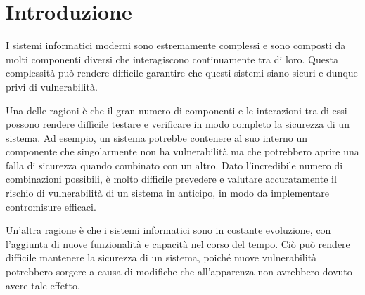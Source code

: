 \documentclass[12pt,italian]{report}
\begin{document}

% 


\chapter{Introduzione}
\label{sec:introduzione}
I sistemi informatici moderni sono estremamente complessi e sono composti da
molti componenti diversi che interagiscono continuamente tra di loro.
Questa complessità può rendere difficile garantire che questi sistemi siano
sicuri e dunque privi di vulnerabilità.

Una delle ragioni è che il gran numero di componenti e le interazioni tra di
essi possono rendere difficile testare e verificare in modo completo la
sicurezza di un sistema.
Ad esempio, un sistema potrebbe contenere al suo interno un componente che
singolarmente non ha vulnerabilità ma che potrebbero aprire una falla di
sicurezza quando combinato con un altro.
Dato l'incredibile numero di combinazioni possibili, è molto difficile
prevedere e valutare accuratamente il rischio di vulnerabilità di un sistema
in anticipo, in modo da implementare contromisure efficaci.

Un'altra ragione è che i sistemi informatici sono in costante evoluzione, con
l'aggiunta di nuove funzionalità e capacità nel corso del tempo.
Ciò può rendere difficile mantenere la sicurezza di un sistema, poiché nuove
vulnerabilità potrebbero sorgere a causa di modifiche che all'apparenza non
avrebbero dovuto avere tale effetto.
\end{document}

